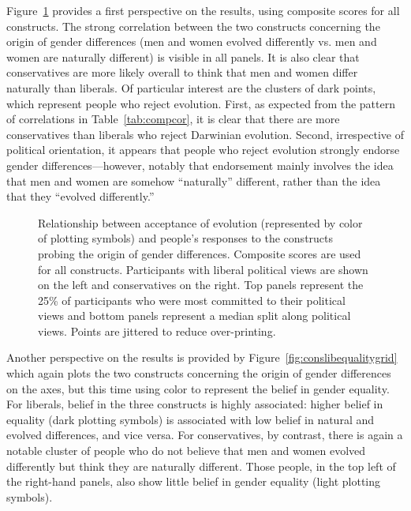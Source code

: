 \documentclass[fignum,man]{apa}\usepackage[]{graphicx}\usepackage[]{color}
\begin{document}
Figure~\ref{fig:conslibevogrid} provides a first perspective on the results,
using composite scores for all constructs. 
The strong correlation between
the two constructs concerning the origin of gender differences (men and women evolved
differently vs. men and women are naturally different) is visible in all panels.
It is also clear that conservatives are more likely overall to think that
men and women differ naturally than liberals. Of particular
interest are the clusters of dark points, which represent people
who reject evolution. First, as expected from the pattern of correlations in 
Table~\ref{tab:compcor}, it is 
clear that there are more conservatives
than liberals who reject Darwinian evolution. Second, irrespective
of political orientation, it appears that people
who reject evolution strongly endorse gender differences---however,
notably that endorsement mainly involves the idea that men and women are
somehow ``naturally'' different, rather than the idea that they
``evolved differently.''
\begin{figure}[tp] %
\caption{Relationship between acceptance of evolution (represented by color
of plotting symbols) and people's responses to the constructs probing the
origin of gender differences. Composite scores are used for all constructs.
 Participants with liberal political
views are shown on the left and conservatives on the right. Top panels
represent the 25\% of participants who were most committed to their
political views and bottom panels represent a median split
along political views. Points are jittered to reduce over-printing.}
\label{fig:conslibevogrid}
\end{figure}

Another perspective on the results is provided by 
Figure~\ref{fig:conslibequalitygrid}
which again plots the two constructs concerning the origin of 
gender differences on the axes, but this time using color to represent the belief in 
gender equality. 
For liberals, belief in the three constructs is highly associated:
higher belief in equality (dark plotting symbols) is associated with low
belief in natural and evolved differences, and vice versa. 
For conservatives, by contrast, there is again a notable
cluster of people who do not believe that men and women evolved differently but
think they are naturally different. Those people, in the top left of
the right-hand panels, also show little belief in gender equality (light
plotting symbols).  
\end{document}
